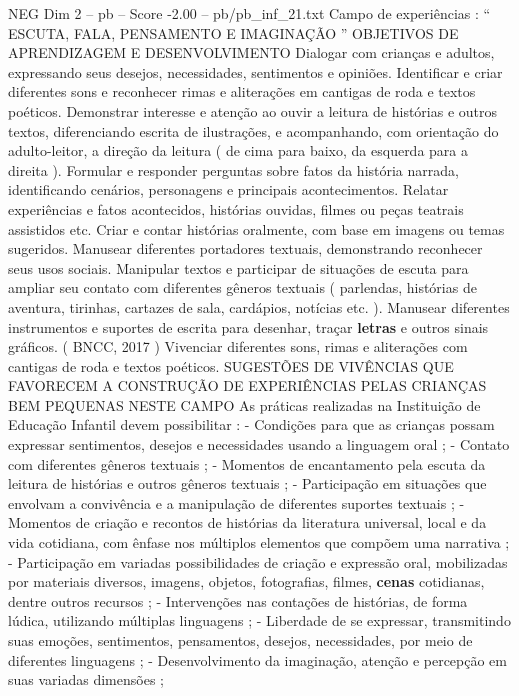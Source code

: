 \begin{textsample}{NEG Dim 2 – pb – Score -2.00 – pb/pb\_inf\_21.txt}  \label{ex:f2_neg_008}
Campo de experiências : “ ESCUTA, FALA, PENSAMENTO E IMAGINAÇÃO ” OBJETIVOS DE APRENDIZAGEM E DESENVOLVIMENTO Dialogar com crianças e adultos, expressando seus desejos, necessidades, sentimentos e opiniões.
Identificar e criar diferentes sons e reconhecer rimas e aliterações em cantigas de roda e textos poéticos.
Demonstrar interesse e atenção ao ouvir a leitura de histórias e outros textos, diferenciando escrita de ilustrações, e acompanhando, com orientação do adulto-leitor, a direção da leitura ( de cima para baixo, da esquerda para a direita ).
Formular e responder perguntas sobre fatos da história narrada, identificando cenários, personagens e principais acontecimentos.
Relatar experiências e fatos acontecidos, histórias ouvidas, filmes ou peças teatrais assistidos etc.
Criar e contar histórias oralmente, com base em imagens ou temas sugeridos.
Manusear diferentes portadores textuais, demonstrando reconhecer seus usos sociais.
Manipular textos e participar de situações de escuta para ampliar seu contato com diferentes gêneros textuais ( parlendas, histórias de aventura, tirinhas, cartazes de sala, cardápios, notícias etc. ).
Manusear diferentes instrumentos e suportes de escrita para desenhar, traçar \textbf{letras} e outros sinais gráficos. ( BNCC, 2017 ) Vivenciar diferentes sons, rimas e aliterações com cantigas de roda e textos poéticos.
SUGESTÕES DE VIVÊNCIAS QUE FAVORECEM A CONSTRUÇÃO DE EXPERIÊNCIAS PELAS CRIANÇAS BEM PEQUENAS NESTE CAMPO As práticas realizadas na Instituição de Educação Infantil devem possibilitar : - Condições para que as crianças possam expressar sentimentos, desejos e necessidades usando a linguagem oral ; - Contato com diferentes gêneros textuais ; - Momentos de encantamento pela escuta da leitura de histórias e outros gêneros textuais ; - Participação em situações que envolvam a convivência e a manipulação de diferentes suportes textuais ; - Momentos de criação e recontos de histórias da literatura universal, local e da vida cotidiana, com ênfase nos múltiplos elementos que compõem uma narrativa ; - Participação em variadas possibilidades de criação e expressão oral, mobilizadas por materiais diversos, imagens, objetos, fotografias, filmes, \textbf{cenas} cotidianas, dentre outros recursos ; - Intervenções nas contações de histórias, de forma lúdica, utilizando múltiplas linguagens ; - Liberdade de se expressar, transmitindo suas emoções, sentimentos, pensamentos, desejos, necessidades, por meio de diferentes linguagens ; - Desenvolvimento da imaginação, atenção e percepção em suas variadas dimensões ;

\end{textsample}
